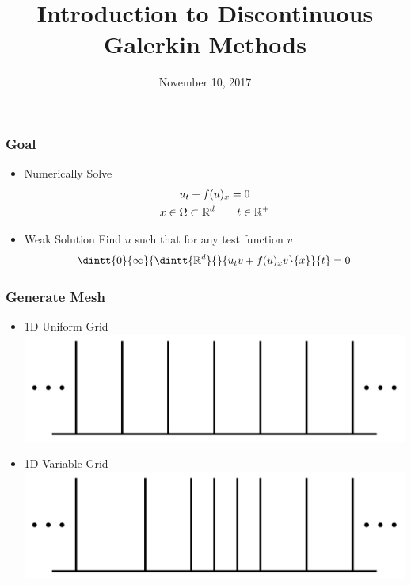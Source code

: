 \documentclass[10pt]{beamer}
\title[]{Introduction to Discontinuous Galerkin Methods} %
\author{} %
\institute[Iowa State University]{%
Mathematics Department, Iowa State University \\ %
\medskip
\textit{logemann@iastate.edu}} %
\date{November 10, 2017} %
\begin{document}
  \begin{frame}
    \titlepage{}
  \end{frame}

  \begin{frame}
    \frametitle{Goal}
    \begin{itemize}
      \item Numerically Solve
        \begin{gather*}
          u_t + f(u)_x = 0 \\
          x \in \Omega \subset \mathbb{R}^d \qquad t \in \mathbb{R}^+
        \end{gather*}

      \item Weak Solution
        Find $u$ such that for any test function $v$
        \[
          \dintt{0}{\infty}{\dintt{\RR^d}{}{u_t v + f(u)_x v}{x}}{t} = 0
        \]
    \end{itemize}
  \end{frame}



  \begin{frame}
    \frametitle{Generate Mesh}
    \begin{itemize}
      \item 1D Uniform Grid
          \includegraphics[scale=0.3]{Figures/1Dgrid}
      \item 1D Variable Grid
          \includegraphics[scale=0.3]{Figures/1Dgrid_nonuniform}
    \end{itemize}
  \end{frame}
\end{document}
